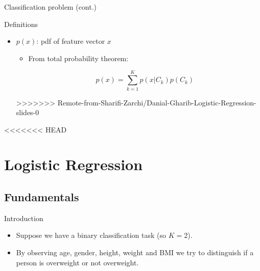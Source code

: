 \documentclass[serif, aspectratio=169]{beamer}
\begin{document}
\begin{frame}{Classification problem (cont.)}
\begin{itemize}
\begin{frame}{Definitions}
\begin{itemize}
        \item $p(x)$: pdf of feature vector $x$ 
            \begin{itemize}
                \item From total probability theorem:   
                
                \[ p(x)=\sum_{k=1}^{K}p(x|C_k)p(C_k)
                \]
            \end{itemize}
        
>>>>>>> Remote-from-Sharifi-Zarchi/Danial-Gharib-Logistic-Regression-slides-0
    \end{itemize}
\end{frame}



<<<<<<< HEAD
\section{Logistic Regression}

\subsection{Fundamentals}


\begin{frame}{Introduction}
    \begin{itemize}
        \item Suppose we have a binary classification task (so $K=2$).
        \item By observing \textcolor{deepred}{age}, \textcolor{deepred}{gender}, \textcolor{deepred}{height}, \textcolor{deepred}{weight} and \textcolor{deepred}{BMI} we try to distinguish if a person is \textcolor{deepgreen}{overweight} or \textcolor{deepgreen}{not overweight}.
        

\end{itemize}
\end{frame}
\end{itemize}
\end{frame}
\end{document}
